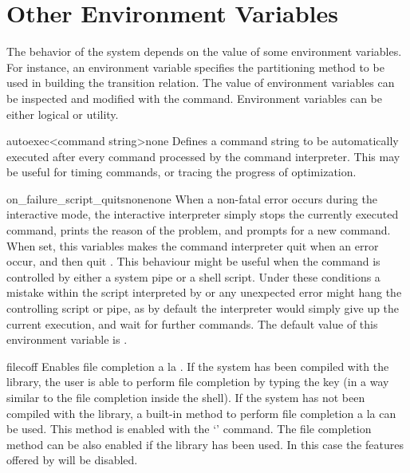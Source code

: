 











\newpage






\section{Other Environment Variables}
\label{Shell configuration Variables}
%
The behavior of the system depends on the value of some environment
variables. For instance, an environment variable specifies the
partitioning method to be used in building the transition relation.  The
value of environment variables can be inspected and modified with the
 command. Environment variables can be either logical
or utility.

\begin{nusmvVar} {autoexec}{<command string>}{none}
Defines a command string to be automatically executed after every
command processed by the command interpreter. This may be useful for
timing commands, or tracing the progress of optimization.
\end{nusmvVar}

\begin{nusmvVar} {on\_failure\_script\_quits}{none}{none}
When a non-fatal error occurs during the interactive mode, the
interactive interpreter simply stops the currently executed command,
prints the reason of the problem, and prompts for a new command.  When
set, this variables makes the command interpreter quit when an error
occur, and then quit \nusmv. This behaviour might be useful when the
command  is controlled by either a system pipe or
a shell script. Under these conditions a mistake within the script
interpreted by  or any unexpected error might
hang the controlling script or pipe, as by default the interpreter
would simply give up the current execution, and wait for further
commands. 
The default value of this environment variable is .
\end{nusmvVar}


\begin{nusmvVar}{filec}{}{off}
Enables file completion a la \csh.  If the system has been compiled
with the \nusmvreadline library, the user is able to perform file
completion by typing the \tab key (in a way similar to the file
completion inside the \bash shell). If the system has not been
compiled with the \nusmvreadline library, a built-in method to perform
file completion a la \csh can be used. This method is enabled with
the `' command. The \csh file completion method can
be also enabled if the \nusmvreadline library has been used. In this case
the features offered by \nusmvreadline will be disabled.
\end{nusmvVar}

